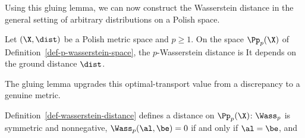 Using this gluing lemma, we can now construct the Wasserstein distance in the general setting of arbitrary distributions on a Polish space.

\begin{defn}\label{def-wasserstein-distance}
Let $(\X,\dist)$ be a Polish metric space and $p\geq1$. On the space $\Pp_p(\X)$ of Definition~\ref{def-p-wasserstein-space}, the $p$-Wasserstein distance is
	It depends on the ground distance $\dist$.
\end{defn}

The gluing lemma upgrades this optimal-transport value from a discrepancy to a genuine metric.

\begin{prop}\label{prop-metric-measure}
	Definition~\ref{def-wasserstein-distance} defines a distance on $\Pp_p(\X)$: $\Wass_p$ is symmetric and nonnegative, $\Wass_p(\al,\be)=0$ if and only if $\al=\be$, and
\end{prop}

